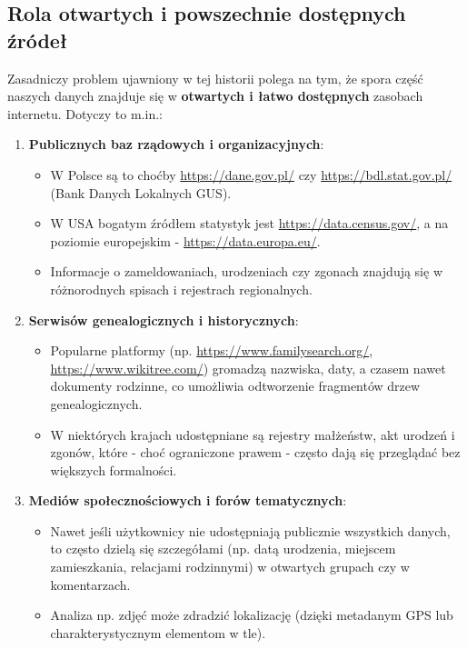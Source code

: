 \subsection{Rola otwartych i powszechnie dostępnych źródeł}

Zasadniczy problem ujawniony w tej historii polega na tym, że spora część naszych danych znajduje się w \textbf{otwartych i łatwo dostępnych} zasobach internetu. Dotyczy to m.in.:

\begin{enumerate}
    \item \textbf{Publicznych baz rządowych i organizacyjnych}:
    \begin{itemize}
        \item W Polsce są to choćby \url{https://dane.gov.pl/} czy \url{https://bdl.stat.gov.pl/} (Bank Danych Lokalnych GUS).
        \item W USA bogatym źródłem statystyk jest \url{https://data.census.gov/}, a na poziomie europejskim - \url{https://data.europa.eu/}.
        \item Informacje o zameldowaniach, urodzeniach czy zgonach znajdują się w różnorodnych spisach i rejestrach regionalnych.
    \end{itemize}

    \item \textbf{Serwisów genealogicznych i historycznych}:
    \begin{itemize}
        \item Popularne platformy (np. \url{https://www.familysearch.org/}, \url{https://www.wikitree.com/}) gromadzą nazwiska, daty, a czasem nawet dokumenty rodzinne, co umożliwia odtworzenie fragmentów drzew genealogicznych.
        \item W niektórych krajach udostępniane są rejestry małżeństw, akt urodzeń i zgonów, które - choć ograniczone prawem - często dają się przeglądać bez większych formalności.
    \end{itemize}

    \item \textbf{Mediów społecznościowych i forów tematycznych}:
    \begin{itemize}
        \item Nawet jeśli użytkownicy nie udostępniają publicznie wszystkich danych, to często dzielą się szczegółami (np. datą urodzenia, miejscem zamieszkania, relacjami rodzinnymi) w otwartych grupach czy w komentarzach.
        \item Analiza np. zdjęć może zdradzić lokalizację (dzięki metadanym GPS lub charakterystycznym elementom w tle).
    \end{itemize}
\end{enumerate}

